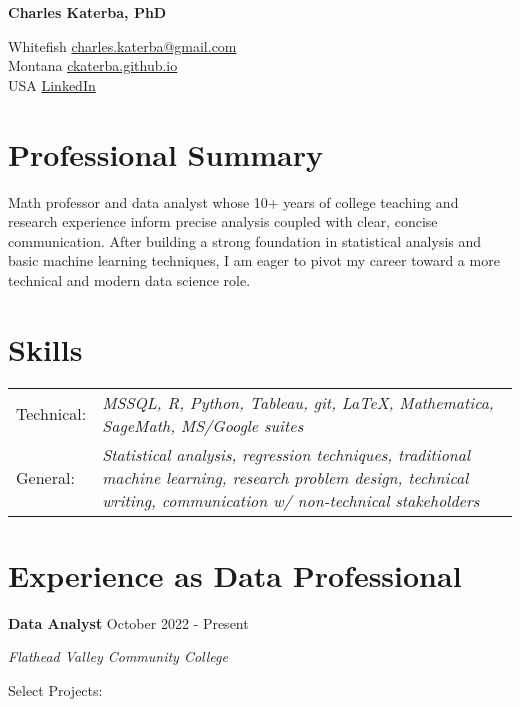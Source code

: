 \documentclass[12pt]{article}
\begin{document}
\begin{center}
     \Huge{\textbf{Charles Katerba, PhD}}
\end{center}
Whitefish \hfill \href{mailto:charles.katerba@gmail.com}{charles.katerba@gmail.com}\\
Montana \hfill \href{https://ckaterba.github.io}{ckaterba.github.io} \\ 
USA  \hfill \href{https://www.linkedin.com/in/charles-katerba-b21b50219/}{LinkedIn}

\section{Professional Summary}

Math professor and data analyst whose 10+ years of college teaching and research experience inform precise analysis coupled with clear, concise communication.  After building a strong foundation in statistical analysis and basic machine learning techniques, I am eager to pivot my career toward a more technical and modern data science role. 

\section{Skills}

\begin{tabular}{  l p{15in} }

Technical: & \textit{MSSQL, R, Python, Tableau, git, \LaTeX, Mathematica, SageMath, MS/Google suites}  \\

General: & \textit{Statistical analysis, regression techniques, traditional machine learning, research 
	\newline problem design, technical writing, communication w/ non-technical stakeholders}
\end{tabular}

\section{Experience as Data Professional}

\textbf{Data Analyst} \hfill October 2022 - Present 

\textit{Flathead Valley Community College}

Select Projects:
\end{document}

